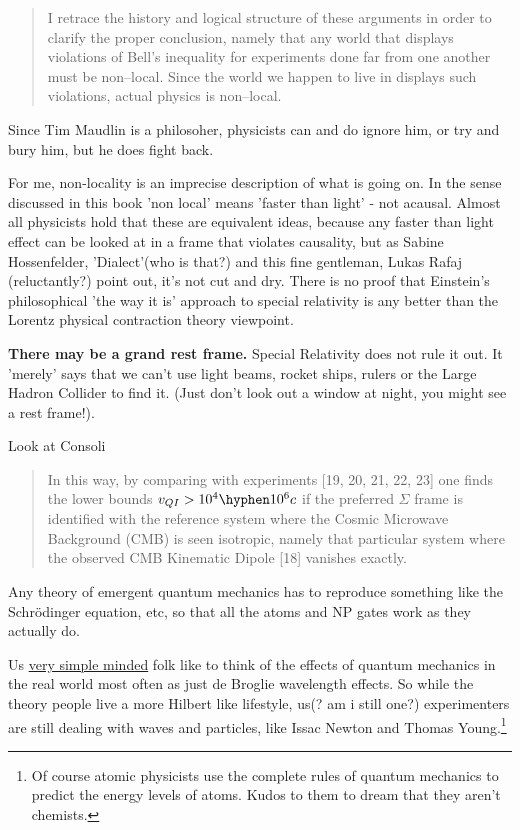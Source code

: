 \documentclass[../rzero]{subfiles}
\begin{document}
\begin{quotation}
	I retrace the history and logical structure of these arguments in order to clarify the proper conclusion, namely that any world that displays violations of Bell's inequality for experiments done far from one another must be non--local. Since the world we happen to live in displays such violations, actual physics is non--local.
\end{quotation}

Since Tim Maudlin is a philosoher, physicists can and do ignore him, or try and bury him\cite{Werner2014}, but he does fight back\cite{WMaudlin2014}. 

For me, non-locality is an imprecise description of what is going on. In the sense discussed in this book 'non local' means 'faster than light' - not acausal. Almost all physicists hold that these are equivalent ideas, because any faster than light effect can be looked at in a frame that violates causality, but as Sabine Hossenfelder\cite{sabinehossenfelderThinkFasterLight2023}, 'Dialect'(who is that?)\cite{dialectWhatTimeDilation2023} and this fine gentleman, Lukas Rafaj (reluctantly?)\cite{physics-problemsandsolutionsOneWaySpeed2023} point out, it's not cut and dry. There is no proof that Einstein's philosophical 'the way it is' approach to special relativity is any better than the Lorentz physical contraction theory viewpoint. 

\textbf{There may be a grand rest frame.} Special Relativity does not rule it out. It 'merely' says that we can't use light beams, rocket ships, rulers or the Large Hadron Collider to find it. (Just don't look out a window at night, you might see a rest frame!).

Look at Consoli \cite{consoliQuantumNonLocalityCMB2022a}

\begin{quotation}
	In this way, by comparing with experiments [19, 20, 21, 22, 23] one finds the lower bounds $v_{QI} > 10^4 \hyphen 10^6c$ if the preferred $\Sigma$ frame is identified with the reference system where the Cosmic Microwave Background (CMB) is seen isotropic, namely that particular system where the observed CMB Kinematic Dipole [18] vanishes exactly. 
\end{quotation}

Any theory of emergent quantum mechanics has to reproduce something like the Schrödinger equation, etc, so that all the atoms and NP gates work as they actually do. 


Us \href{https://youtu.be/p5nWKkyzh_Y?si=eSFOG0lw4fJo7tO2&t=1153}{very simple minded} folk\cite{instituteforadvancedstudySpacetimeQuantumMechanics2021} like to think of the effects of quantum mechanics in the real world most often as just de Broglie wavelength effects. So while the theory people live a more Hilbert like lifestyle, us(? am i still one?) experimenters are still dealing with waves and particles, like Issac Newton and Thomas Young.\footnote{Of course atomic physicists use the complete rules of quantum mechanics to predict the energy levels of atoms. Kudos to them to dream that they aren't chemists.} 
\end{document}
